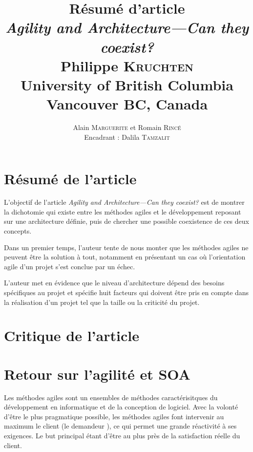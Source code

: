 \documentclass[11pt,a4paper,utf8x]{article}
\title{{\large \textbf{Résumé d'article}\\\emph{Agility and Architecture—Can they coexist?}\\\vspace{1ex}
 {\scriptsize Philippe \textsc{Kruchten}\\\vspace{0.5ex}University of British Columbia\\\vspace{-4ex}
Vancouver BC, Canada}}}
\author{\small Alain \textsc{Marguerite} et Romain \textsc{Rincé}\\{\small Encadrant : Dalila \textsc{Tamzalit}}}
\date{}
\begin{document}
\maketitle
\renewcommand{\labelitemi}{$\bullet$} 


\section{Résumé de l'article}\label{sec:res}
L'objectif de l'article \emph{Agility and Architecture—Can they coexist?}  \cite{krutchen} est de montrer la dichotomie qui existe entre les méthodes agiles et le développement reposant sur une architecture définie, puis de chercher une possible coexistence de ces deux concepts. 

Dans un premier temps, l'auteur tente de nous monter que les méthodes agiles ne peuvent être la solution à tout, notamment en présentant un cas où l'orientation agile d'un projet s'est conclue par un échec. 

L'auteur met en évidence que le \og niveau\fg{} d'architecture dépend des besoins spécifiques au projet et spécifie huit facteurs qui doivent être pris en compte dans la réalisation d'un projet tel que la taille ou la criticité du projet.

\section{Critique de l'article}\label{sec:cri}


\section{Retour sur l'agilité et SOA}\label{sec:ret}
Les méthodes agiles sont un ensembles de méthodes caractérisitques du développement en informatique et de la conception de logiciel. Avec la volonté d'être le plus pragmatique possible, les méthodes agiles font intervenir au maximum le client (le \og demandeur \fg{}), ce qui permet une grande réactivité à ses exigences. Le but principal étant d'être au plus près de la satisfaction réelle du client.
\end{document}
